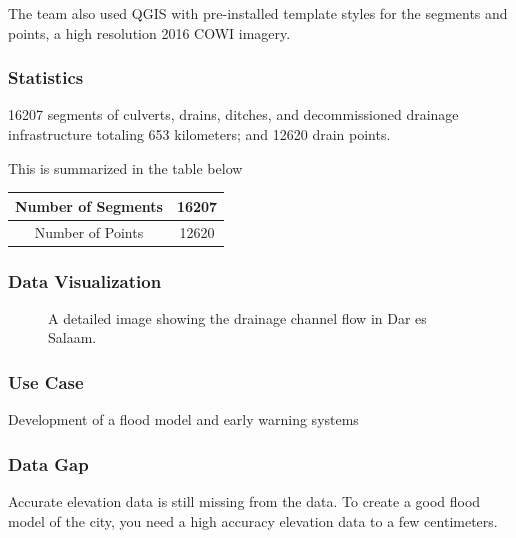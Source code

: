 \documentclass[a4paper,12pt,twoside]{article}
\begin{document}
The team also used QGIS with pre-installed template styles for the segments and points, a high resolution 2016 COWI imagery.

\subsubsection{Statistics}
16207 segments of culverts, drains, ditches, and decommissioned drainage infrastructure totaling 653 kilometers; and 12620 drain points.

This is summarized in the table below

\begin{center}
\begin{tabular}{|c|c|}
\hline
   Number of Segments & 16207 \\
\hline
   Number of Points & 12620 \\
   \hline
\end{tabular}
\end{center}

\subsubsection{Data Visualization}
\begin{figure}[h]
 \color{RHgreen}\caption{A detailed image showing the drainage channel flow in Dar es Salaam.}
\end{figure}

\subsubsection{Use Case}
Development of a flood model and early warning systems

\subsubsection{Data Gap}
Accurate elevation data is still missing from the data. To create a good flood model of the city, you need a high accuracy elevation data to a few centimeters.
\end{document}
